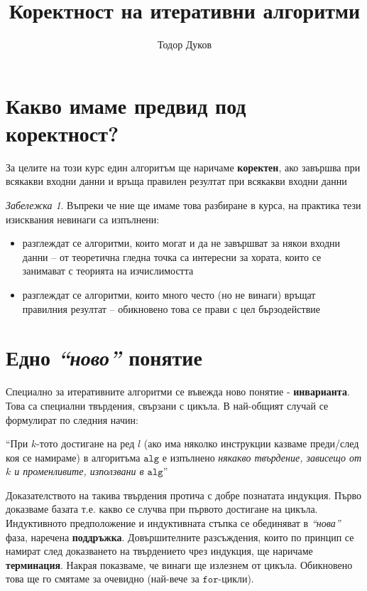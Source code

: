 \documentclass{article}
\title{Коректност на итеративни алгоритми}
\author{Тодор Дуков}
\date{}
\theoremstyle{definition}
\theoremstyle{plain}
\theoremstyle{remark}
\newtheorem*{remark}{Забележка}
\theoremstyle{definition}
\begin{document}
\maketitle

\section*{Какво имаме предвид под коректност?}

За целите на този курс един алгоритъм ще наричаме \textbf{коректен}, ако завършва при всякакви входни данни и връща правилен резултат при всякакви входни данни

\begin{remark}
    Въпреки че ние ще имаме това разбиране в курса, на практика тези изисквания невинаги са изпълнени:
    \begin{itemize}
        \item разглеждат се алгоритми, които могат и да не завършват за някои входни данни -- от теоретична гледна точка са интересни за хората, които се занимават с теорията на изчислимостта
        \item разглеждат се алгоритми, които много често (но не винаги) връщат правилния резултат -- обикновено това се прави с цел бързодействие
    \end{itemize}
\end{remark}

\section*{Едно \textit{``ново''} понятие}

Специално за итеративните алгоритми се въвежда ново понятие - \textbf{инварианта}.
Това са специални твърдения, свързани с цикъла.
В най-общият случай се формулират по следния начин:
\begin{center}
    ``При $k$-тото достигане на ред $l$ (ако има няколко инструкции казваме преди/след коя се намираме) в алгоритъма $\mathtt{alg}$ е изпълнено \textit{някакво твърдение, зависещо от $k$ и променливите, използвани в $\mathtt{alg}$}''
\end{center}
Доказателството на такива твърдения протича с добре познатата индукция.
Първо доказваме базата т.е. какво се случва при първото достигане на цикъла.
Индуктивното предположение и индуктивната стъпка се обединяват в \textit{``нова''} фаза, наречена \textbf{поддръжка}.
Довършителните разсъждения, които по принцип се намират след доказването на твърдението чрез индукция, ще наричаме \textbf{терминация}.
Накрая показваме, че винаги ще излезнем от цикъла.
Обикновено това ще го смятаме за очевидно (най-вече за $\mathtt{for}$-цикли).
\end{document}
